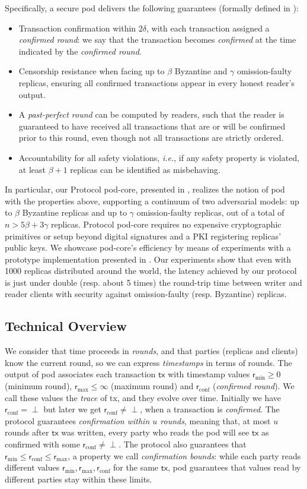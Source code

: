 \documentclass[pdflatex,sn-mathphys-num]{sn-jnl}%
\theoremstyle{thmstyleone}%
\theoremstyle{thmstyletwo}%
\theoremstyle{thmstylethree}%
\newcommand{\podtm}{\textsf{pod}\xspace}
\newcommand{\operand}[1]{\textsf{#1}}
\newcommand{\tx}{\operand{tx}\xspace}
\newcommand{\round}{\operand{r}\xspace}
\newcommand{\rconf}{\ensuremath{\round_\text{conf}}\xspace}
\newcommand{\rmin}{\ensuremath{\round_\text{min}}\xspace}
\newcommand{\rmax}{\ensuremath{\round_\text{max}}\xspace}
\newcommand{\confirmed}{confirmed\xspace}
\let\oldbeta\beta
\renewcommand{\beta}{\ensuremath{\oldbeta}\xspace}
\let\oldgamma\gamma
\renewcommand{\gamma}{\ensuremath{\oldgamma}\xspace}
\begin{document}
Specifically, a secure \podtm delivers the following guarantees (formally defined in ):
\begin{itemize}
    \item Transaction confirmation within $2\delta$, with each transaction assigned a \emph{\confirmed round}: we say that the transaction becomes \emph{confirmed} at the time indicated by the \emph{confirmed round}.
    \item Censorship resistance when facing up to $\beta$ Byzantine and $\gamma$ omission-faulty replicas, ensuring all confirmed transactions appear in every honest reader's output.
    \item A \emph{past-perfect round} can be computed by readers, such that the reader is guaranteed to have received all transactions that are or will be confirmed prior to this round, even though not all transactions are strictly ordered.
    \item Accountability for all safety violations, \textit{i.e.}, if any safety property is violated, at least $\beta + 1$ replicas can be identified as misbehaving.
\end{itemize}

In particular, our Protocol \podtm-core, presented in , realizes the notion of \podtm with the properties above, supporting a continuum of two adversarial models: up to \beta Byzantine replicas and up to \gamma omission-faulty replicas, out of a total of $n > 5 \beta + 3 \gamma$ replicas.
Protocol \podtm-core requires no expensive cryptographic primitives or setup beyond digital signatures and a PKI registering replicas' public keys. We showcase \podtm-core's efficiency by means of experiments with a prototype implementation presented in . Our experiments show that even with 1000 replicas distributed around the world, the latency achieved by our protocol is just under double (resp. about 5 times) the round-trip time between writer and reader clients with security against omission-faulty (resp. Byzantine) replicas.

\subsection{Technical Overview}
We consider that time proceeds in \emph{rounds}, and that parties (replicas and clients) know the current round, so we can express \emph{timestamps} in terms of rounds. The output of \podtm associates each transaction $\tx$ with timestamp values $\rmin \geq 0$ (minimum round), $\rmax \leq \infty$ (maximum round) and $\rconf$ (\emph{confirmed round}). We call these values the \emph{trace} of \tx, and they evolve over time.
Initially we have $\rconf=\perp$ but later we get $\rconf \neq \perp$, when a transaction is \emph{confirmed}. The protocol guarantees \emph{confirmation within $u$ rounds}, meaning that, at most $u$ rounds after $\tx$ was written, every party who reads the \podtm will see $\tx$ as confirmed with some $\rconf \neq \perp$.
The protocol also guarantees that $\rmin \leq \rconf \leq \rmax$, a property we call \emph{confirmation bounds}:
while each party reads different values $\rmin,\rmax,\rconf$ for the same $\tx$, \podtm guarantees that values read by different parties stay within these limits.
\end{document}
